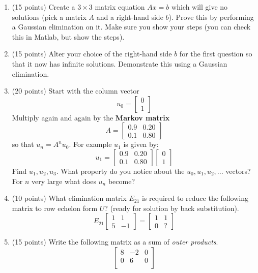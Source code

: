 \documentclass[10pt, a4paper]{article}
\theoremstyle{break}
\begin{document}
\begin{enumerate}
\item (15 points) Create a $3 \times 3$ matrix equation $Ax=b$ which will give no solutions (pick a matrix $A$ and a right-hand side $b$). Prove this by performing a Gaussian elimination on it. Make sure you show your steps (you can check this in Matlab, but show the steps). 
\item (15 points) Alter your choice of the right-hand side $b$ for the first question so that it now has infinite solutions. Demonstrate this using a Gaussian elimination. 
\item (20 points) Start with the column vector $$u_0=\begin{bmatrix} 0 \\ 1 \end{bmatrix}$$ Multiply again and again by the \textbf{Markov matrix} $$A= \begin{bmatrix}
0.9 & 0.20 \\
0.1 & 0.80
\end{bmatrix} $$
so that $u_n=A^n u_0$. For example $u_1$ is given by:
$$u_1=\begin{bmatrix}
0.9 & 0.20 \\
0.1 & 0.80
\end{bmatrix} \begin{bmatrix} 0 \\1 \end{bmatrix}$$
Find $u_1,u_2,u_3$. What property do you notice about the $u_0, u_1, u_2, ...$ vectors? For $n$ very large what does $u_n$ become?
\item (10 points) What elimination matrix $E_{21}$ is required to reduce the following matrix to row echelon form $U$? (ready for solution by back substitution).
\begin{equation}
E_{21}
\begin{bmatrix}
1 & 1 \\
5 & -1 
\end{bmatrix}
=\begin{bmatrix}
1 &1 \\ 0 & ?
\end{bmatrix}
\end{equation}
\item (15 points) Write the following matrix as a sum of \textit{outer products}. 
\begin{equation}
\begin{bmatrix}
 8 & -2 & 0 \\
 0 & 6 & 0 \\

\end{bmatrix}
\end{equation}
\end{enumerate}
\end{document}

